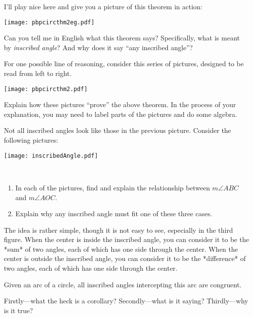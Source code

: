 \documentclass[nooutcomes]{ximera}
\begin{document}
I'll play nice here and give you a picture of this theorem in action:
\begin{image}
\texttt{[image: pbpcircthm2eg.pdf]}
\end{image}

\begin{problem}
Can you tell me in English what this theorem says?  Specifically, what is meant by
\textit{inscribed angle}?  And why does it say ``any inscribed angle''?
\end{problem}

\begin{problem} 
For one possible line of reasoning, consider this series of pictures, designed to be read from left to right.
\begin{image}
\texttt{[image: pbpcircthm2.pdf]}
\end{image}

Explain how these pictures ``prove'' the above theorem. In the process
of your explanation, you may need to label parts of the pictures and
do some algebra.
\end{problem}


\begin{problem}
Not all inscribed angles look like those in the previous picture.  Consider the following pictures:  
\begin{image}
\texttt{[image: inscribedAngle.pdf]}
\end{image}
\
\begin{enumerate}
\item In each of the pictures, find and explain the relationship between $m\angle ABC$ and $m\angle AOC$.
\item Explain why any inscribed angle must fit one of these three cases.  
\end{enumerate}
\end{problem}

\begin{teachingnote}
The idea is rather simple, though it is not easy to see, especially in the third figure.  When the center is inside the inscribed angle, you can consider it to be the *sum* of two angles, each of which has one side through the center.  When the center is outside the inscribed angle, you can consider it to be the *difference* of two angles, each of which has one side through the center.  
\end{teachingnote}

\begin{corollary} 
Given an arc of a circle, all inscribed angles intercepting this arc are congruent.
\end{corollary}

\begin{problem} 
Firstly---what the heck is a corollary? Secondly---what is it saying?
Thirdly---why is it true?
\end{problem}
\end{document}

